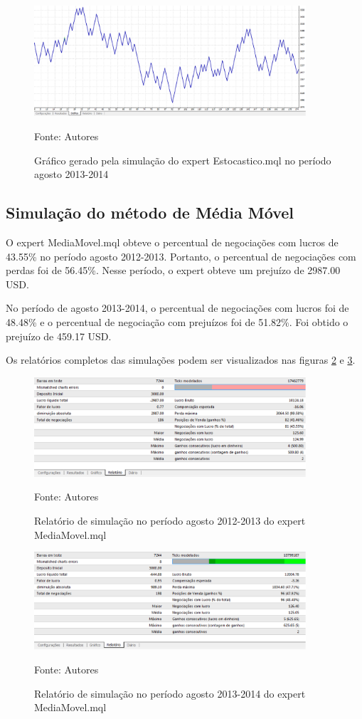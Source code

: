 \begin{figure}[htp]
\centering
\includegraphics[width=0.9\textwidth]{figuras/protocoloEst4}
\caption{Gráfico gerado pela simulação do expert Estocastico.mql no período agosto 2013-2014}{Fonte: Autores} 
\label{protocoloEst4}
\end{figure}

\subsection{Simulação do método de Média Móvel}

O expert MediaMovel.mql obteve o percentual de negociações com lucros de 43.55\% no período agosto 2012-2013. Portanto, o percentual de negociações com perdas foi de 56.45\%. Nesse período, o expert obteve um prejuízo de 2987.00 USD. 

No período de agosto 2013-2014, o percentual de negociações com lucros foi de 48.48\% e o percentual de negociação com prejuízos foi de 51.82\%.  Foi obtido o prejuízo de 459.17 USD. 

Os relatórios completos das simulações podem ser visualizados nas figuras \ref{protocoloMedia} e \ref{protocoloMedia2}.

\begin{figure}[htp]
\centering
\includegraphics[width=0.9\textwidth]{figuras/protocoloMedia}
\caption{Relatório de simulação no período agosto 2012-2013 do expert MediaMovel.mql}{Fonte: Autores} 
\label{protocoloMedia}
\end{figure}

\begin{figure}[htp]
\centering
\includegraphics[width=0.9\textwidth]{figuras/protocoloMedia2}
\caption{Relatório de simulação no período agosto 2013-2014 do expert MediaMovel.mql}{Fonte: Autores} 
\label{protocoloMedia2}
\end{figure}

